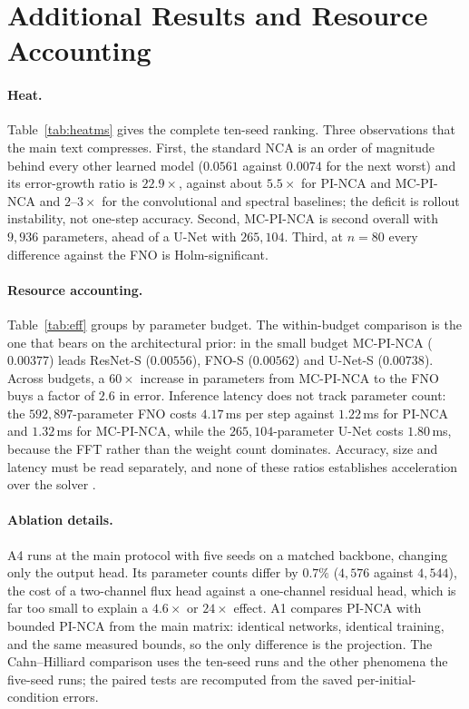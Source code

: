 

\section{Additional Results and Resource Accounting}
\label{sec:additional-results}

\paragraph{Heat.}
Table~\ref{tab:heatms} gives the complete ten-seed ranking. Three observations that the
main text compresses. First, the standard NCA is an order of magnitude behind every other
learned model ($0.0561$ against $0.0074$ for the next worst) and its error-growth ratio is
$22.9\times$, against about $5.5\times$ for PI-NCA and MC-PI-NCA and $2$--$3\times$ for
the convolutional and spectral baselines; the deficit is rollout instability, not one-step
accuracy. Second, MC-PI-NCA is second overall with $9{,}936$ parameters, ahead of a U-Net
with $265{,}104$. Third, at $n=80$ every difference against the FNO is Holm-significant.





\paragraph{Resource accounting.}
Table~\ref{tab:eff} groups by parameter budget. The within-budget comparison is the one
that bears on the architectural prior: in the small budget MC-PI-NCA ($0.00377$) leads
ResNet-S ($0.00556$), FNO-S ($0.00562$) and U-Net-S ($0.00738$). Across budgets, a
$60\times$ increase in parameters from MC-PI-NCA to the FNO buys a factor of $2.6$ in
error. Inference latency does not track parameter count: the $592{,}897$-parameter FNO
costs $4.17$\,ms per step against $1.22$\,ms for PI-NCA and $1.32$\,ms for MC-PI-NCA,
while the $265{,}104$-parameter U-Net costs $1.80$\,ms, because the FFT rather than the
weight count dominates. Accuracy, size and latency must be read separately, and none of
these ratios establishes acceleration over the solver \citep{mcgreivy2024baselines}.

\paragraph{Ablation details.}
A4 runs at the main protocol with five seeds on a matched backbone, changing only the
output head. Its parameter counts differ by $0.7\%$ ($4{,}576$ against $4{,}544$), the cost
of a two-channel flux head against a one-channel residual head, which is far too small to
explain a $4.6\times$ or $24\times$ effect. A1 compares PI-NCA with bounded PI-NCA from the
main matrix: identical networks, identical training, and the same measured bounds, so the
only difference is the projection. The Cahn--Hilliard comparison uses the ten-seed runs
and the other phenomena the five-seed runs; the paired tests are recomputed from the saved
per-initial-condition errors.

